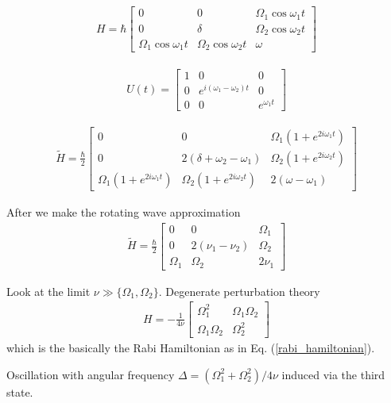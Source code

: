 \begin{align}
  H=\hbar
  \begin{bmatrix}
    0 & 0 & \Omega_1 \cos\omega_1 t \\
    0 & \delta & \Omega_2 \cos\omega_2 t \\
    \Omega_1 \cos\omega_1 t & \Omega_2 \cos\omega_2 t & \omega
  \end{bmatrix}
\end{align}

\begin{align}
  U(t) = 
  \begin{bmatrix}
    1 & 0 & 0 \\
    0 & e^{i(\omega_1 - \omega_2)t} & 0 \\
    0 & 0 & e^{\omega_1 t}
  \end{bmatrix}
\end{align}

\begin{align}
  \tilde{H}=\frac{\hbar}{2}
  \begin{bmatrix}
    0 & 0 & \Omega_1(1+e^{2i\omega_1 t}) \\
    0 & 2(\delta + \omega_2 - \omega_1) & \Omega_2 (1+e^{2i\omega_2 t}) \\
    \Omega_1(1+e^{2i\omega_1 t}) & \Omega_2 (1+e^{2i\omega_2 t}) & 2(\omega - \omega_1)
  \end{bmatrix}
\end{align}

After we make the rotating wave approximation
\begin{align}
  \tilde{H}=\frac{\hbar}{2}
  \begin{bmatrix}
    0 & 0 & \Omega_1 \\
    0 & 2(\nu_1 - \nu_2) & \Omega_2  \\
    \Omega_1 & \Omega_2  & 2\nu_1
  \end{bmatrix}
\end{align}

Look at the limit $\nu \gg \{\Omega_1, \Omega_2\}$.  Degenerate perturbation theory
\begin{align}
  H = -\frac{1}{4\nu}
  \begin{bmatrix}
    \Omega_1^2 & \Omega_1 \Omega_2 \\
    \Omega_1\Omega_2 & \Omega_2^2
  \end{bmatrix}
\end{align}
which is the basically the Rabi Hamiltonian as in Eq. (\ref{rabi_hamiltonian}).

Oscillation with angular frequency $\Delta = (\Omega_1^2 + \Omega_2^2)/4\nu$ induced via the third state.



